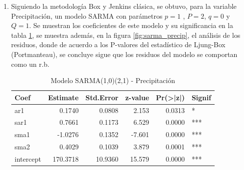 \documentclass[12pt,oneside]{book}\usepackage[]{graphicx}\usepackage[]{color}
\newenvironment{knitrout}{}{} %
\theoremstyle{definition} %
\begin{document}
\begin{enumerate}

\item Siguiendo la metodología Box y Jenkins clásica, se obtuvo, para la variable Precipitación, un modelo SARMA con parámetros $p=1$ , $P=2$, $q=0$ y $Q=1$. Se muestran los coeficientes de este modelo y su significancia en la tabla \ref{tab:sarma_precip}, se muestra además, en la figura \ref{fig:sarma_precip}, el análisis de los residuos, donde de acuerdo a los P-valores del estadístico de Ljung-Box (Portmanteau), se concluye sigue que los residuos del modelo se comportan como un r.b.

\begin{knitrout}
\color{fgcolor}\begin{table}

\caption{\label{tab:model_x1}\label{tab:sarma_precip}Modelo SARMA(1,0)(2,1) - Precipitación}
\centering
\begin{threeparttable}
\begin{tabular}[t]{lrrrrl}
\toprule
Coef & Estimate & Std.Error & z-value & Pr(>|z|) & Signif\\
\midrule
\rowcolor{gray!6}  ar1 & 0.1740 & 0.0808 & 2.153 & 0.0313 & *\\
sar1 & 0.7661 & 0.1173 & 6.529 & 0.0000 & ***\\
\rowcolor{gray!6}  sma1 & -1.0276 & 0.1352 & -7.601 & 0.0000 & ***\\
sma2 & 0.4029 & 0.1039 & 3.879 & 0.0001 & ***\\
\rowcolor{gray!6}  intercept & 170.3718 & 10.9360 & 15.579 & 0.0000 & ***\\
\bottomrule
\end{tabular}
\end{threeparttable}
\end{table}


\end{knitrout}



\begin{knitrout}
\color{fgcolor}\begin{figure}[H]


\end{figure}
\end{knitrout}
\end{enumerate}
\end{document}
